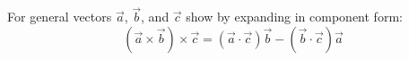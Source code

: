 For general vectors $\vec{a}$, $\vec{b}$, and $\vec{c}$ show by expanding in component form:
\begin{equation*}
	\left(\vec{a} \times \vec{b}\right) \times \vec{c}=\left(\vec{a}\cdot\vec{c}\right)\vec{b}-\left(\vec{b}\cdot\vec{c}\right)\vec{a}
\end{equation*}